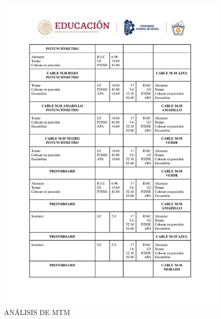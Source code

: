     \begin{figure}
        \centering
    \includegraphics[trim = {0mm 0mm 0mm 0mm},clip,scale=0.3]{24/Img/analisisMTM2.pdf}
    \caption{ANÁLISIS DE MTM}
        \label{analisis2}
    \end{figure}
